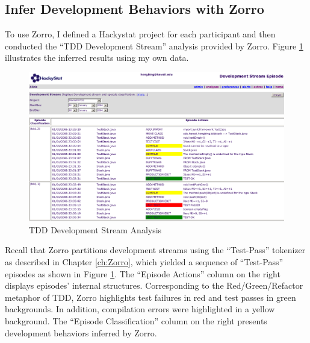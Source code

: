 \subsection{Infer Development Behaviors with Zorro}
To use Zorro, I defined a Hackystat project for each participant and then conducted the ``TDD Development Stream'' analysis provided by Zorro. Figure \ref{fig:gui} illustrates the inferred results using my own data. 
\begin{figure}[htbp]
  \centering
  \includegraphics[width=1.0\textwidth]{figs/Zorro-Gui}
  \caption{TDD Development Stream Analysis}\label{fig:gui}
\end{figure}
Recall that Zorro partitions development streams using the ``Test-Pass'' tokenizer as described in Chapter \ref{ch:Zorro}, which yielded a sequence of ``Test-Pass'' episodes as shown in Figure \ref{fig:gui}. The ``Episode Actions'' column on the right displays episodes' internal structures. Corresponding to the Red/Green/Refactor metaphor of TDD, Zorro highlights test failures in red and test passes in green backgrounds. In addition, compilation errors were highlighted in a yellow background. The ``Episode Classification'' column on the right presents development behaviors inferred by Zorro. 

